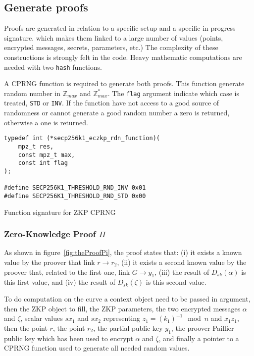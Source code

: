 \subsection{Generate proofs}

Proofs are generated in relation to a specific setup and a specific in progress
signature. which makes them linked to a large number of values (points, encrypted
messages, secrets, parameters, etc.) The complexity of these constructions is
strongly felt in the code. Heavy mathematic computations are needed with two
\texttt{hash} functions.

A CPRNG function is required to generate both proofs. This function generate
random number in $\mathbb{Z}_{max}$ and $\mathbb{Z}_{max}^*$. The \texttt{flag}
argument indicate which case is treated, \texttt{STD} or \texttt{INV}. If the
function have not access to a good source of randomness or cannot generate a
good random number a zero is returned, otherwise a one is returned.

\begin{listing}
  \begin{verbatim}
typedef int (*secp256k1_eczkp_rdn_function)(
    mpz_t res,
    const mpz_t max,
    const int flag
);

#define SECP256K1_THRESHOLD_RND_INV 0x01
#define SECP256K1_THRESHOLD_RND_STD 0x00
  \end{verbatim}
	\caption{Function signature for ZKP CPRNG}
	\label{lst:funcSigZKPCPRGN}
\end{listing}

\subsubsection{Zero-Knowledge Proof $\Pi$}

As shown in figure~\ref{fig:theProofPi}, the proof states that: (i) it exists a known value by
the proover that link $r \rightarrow r_2$, (ii) it exists a second known value by
the proover that, related to the first one, link $G \rightarrow y_1$, (iii) the
result of $D_{sk}(\alpha)$ is this first value, and (iv) the result of
$D_{sk}(\zeta)$ is this second value.

To do computation on the curve a context object need to be passed in argument,
then the ZKP object to fill, the ZKP parameters, the two encrypted messages
$\alpha$ and $\zeta$, scalar values $sx_1$ and $sx_2$ representing
$z_1 = (k_1)^{-1} \mod n$ and $x_1z_1$, then
the point $r$, the point $r_2$, the partial public key $y_1$, the proover Paillier
public key which has been used to encrypt $\alpha$ and $\zeta$, and finally a
pointer to a CPRNG function used to generate all needed random values.

